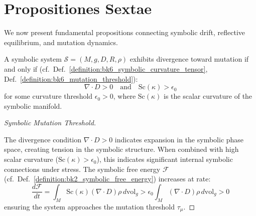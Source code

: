 \section{Propositiones Sextae}
\label{sec:bk6_propositiones_sextae}
We now present fundamental propositions connecting symbolic drift, reflective equilibrium, and mutation dynamics.
\begin{proposition}
\label{proposition:bk6_structural_divergence_condition}
A symbolic system $\mathcal{S} = (M, g, D, R, \rho)$ exhibits divergence toward mutation if and only if (cf.~Def.~\ref{definition:bk6_symbolic_curvature_tensor}, Def.~\ref{definition:bk6_mutation_threshold}):
\begin{equation}
\nabla \cdot D > 0 \quad \text{and} \quad \text{Sc}(\kappa) > \epsilon_0
\end{equation}
for some curvature threshold $\epsilon_0 > 0$, where $\text{Sc}(\kappa)$ is the scalar curvature of the symbolic manifold.
\begin{proof}[Symbolic Mutation Threshold]
\label{proof:bk6_symbolic_mutation_threshold}
\leavevmode

The divergence condition $\nabla \cdot D > 0$ indicates expansion in the symbolic phase space, creating tension in the symbolic structure. When combined with high scalar curvature ($\text{Sc}(\kappa) > \epsilon_0$), this indicates significant internal symbolic connections under stress. The symbolic free energy $\mathcal{F}$ (cf.~Def.~\ref{definition:bk2_symbolic_free_energy}) increases at rate:
\begin{equation}
\frac{d\mathcal{F}}{dt} = \int_M \text{Sc}(\kappa)(\nabla \cdot D)\rho \, d\text{vol}_g > \epsilon_0 \int_M (\nabla \cdot D)\rho \, d\text{vol}_g > 0
\end{equation}
ensuring the system approaches the mutation threshold $\tau_\mu$.
\end{proof}
\end{proposition}
